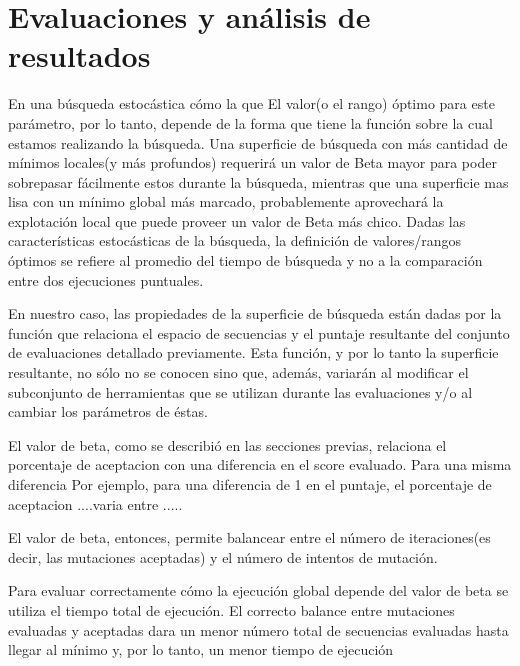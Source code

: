 \chapter{Evaluaciones y análisis de resultados}
\label{results}

En una búsqueda estocástica cómo la que 
El valor(o el rango) óptimo para este parámetro, por lo tanto, depende de la forma que tiene la función sobre la cual estamos realizando la búsqueda.
Una superficie de búsqueda con más cantidad de mínimos locales(y más profundos) requerirá un valor de Beta mayor para poder sobrepasar fácilmente estos durante la búsqueda, 
mientras que una superficie mas lisa con un mínimo global más marcado, probablemente aprovechará la explotación local que puede proveer un valor de Beta más chico. 
Dadas las características estocásticas de la búsqueda, la definición de valores/rangos óptimos se refiere al promedio del tiempo de búsqueda y no a la comparación entre dos ejecuciones puntuales.

En nuestro caso, las propiedades de la superficie de búsqueda están dadas por la función que relaciona el espacio de secuencias y el puntaje resultante del conjunto de evaluaciones detallado previamente.
Esta función, y por lo tanto la superficie resultante, no sólo no se conocen sino que, además, variarán al modificar el subconjunto de herramientas que se utilizan durante las evaluaciones y/o al cambiar los parámetros de éstas.

El valor de beta, como se describió en las secciones previas, relaciona el porcentaje de aceptacion con una diferencia en el score evaluado.
Para una misma diferencia
Por ejemplo, para una diferencia de 1 en el puntaje, el porcentaje de aceptacion ....varia entre .....

El valor de beta, entonces, permite balancear entre el número de iteraciones(es decir, las mutaciones aceptadas) y el número de intentos de mutación.  

Para evaluar correctamente cómo la ejecución global depende del valor de beta se utiliza el tiempo total de ejecución. 
El correcto balance entre mutaciones evaluadas y aceptadas dara un menor número total de secuencias evaluadas hasta llegar al mínimo y, por lo tanto, un menor tiempo de ejecución 

